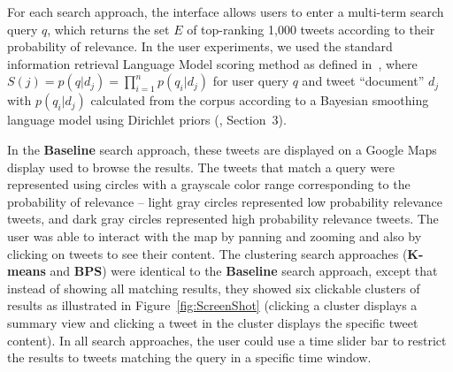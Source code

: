 
For each search approach, the interface allows users to enter a multi-term search query $q$, which returns the set $E$ of top-ranking 1,000 tweets according to their probability of relevance.
In the user experiments, we used the standard information retrieval Language Model scoring method as defined in~\cite{Zhai2001}, where $S(j) = p(q|d_j) = \prod_{i=1}^n p(q_i|d_j)$ for user query $q$ and tweet ``document'' $d_j$ with $p(q_i|d_j)$ calculated from the corpus according to a Bayesian smoothing language model using Dirichlet priors (\cite{Zhai2001}, Section~3). 

In the {\bf Baseline} search approach, these tweets are displayed on a Google Maps display used to browse the results.
The tweets that match a query were represented using circles with a grayscale color range corresponding to the probability of relevance -- light gray circles represented low probability relevance tweets, and dark gray circles represented high probability relevance tweets.
The user was able to interact with the map by panning and zooming and also by clicking on tweets to see their content.
The clustering search approaches ({\bf $\mathbf{K}$-means} and {\bf BPS}) were identical to the
{\bf Baseline} search approach, except that instead of showing all matching results, they showed six clickable clusters of results as illustrated in Figure~\ref{fig:ScreenShot} (clicking a cluster displays a summary view and clicking a tweet in the cluster displays the specific tweet content).
In all search approaches, the user could use a time slider bar to restrict the results to tweets matching the query in a specific time window. 

